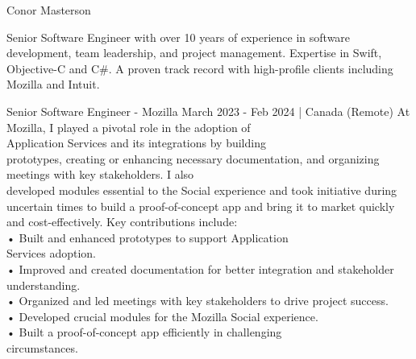 \documentclass[
	10pt, %
]{FreemanCV}
\begin{document}
	
{\sffamily\Huge\noindent Conor Masterson} %
	
\medskip %
	
{\noindent Senior Software Engineer with over 10 years of experience in software development, team leadership, and project management. Expertise in Swift, Objective-C and C\#. A proven track record with high-profile clients including Mozilla and Intuit.}
\medskip

\begin{paracol}{2} %


\jobentry
	{Senior Software Engineer - Mozilla}
    {March 2023 - Feb 2024 | Canada (Remote)}
    {At Mozilla, I played a pivotal role in the adoption of \\Application Services and its integrations by building \\prototypes, creating or enhancing necessary documentation, and organizing meetings with key stakeholders. I also \\developed modules essential to the Social experience and took initiative during uncertain times to build a proof-of-concept app and bring it to market quickly and cost-effectively. Key contributions include:\medskip\\
    • Built and enhanced prototypes to support Application \\Services adoption.\\
    • Improved and created documentation for better integration and stakeholder understanding.\\
    • Organized and led meetings with key stakeholders to drive project success.\\
    • Developed crucial modules for the Mozilla Social experience.\\
    • Built a proof-of-concept app efficiently in challenging \\circumstances.}



\end{paracol}
\end{document}
